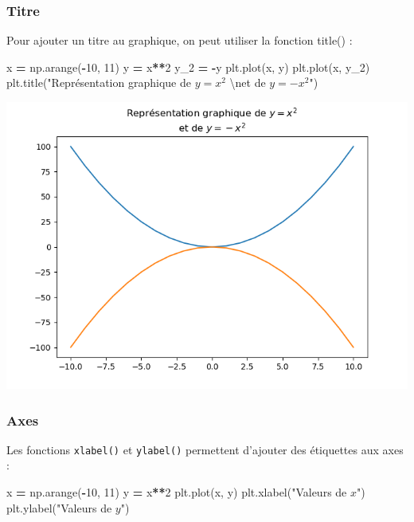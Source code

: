 \documentclass[12pt,]{book}
\newenvironment{Shaded}{\begin{snugshade}}{\end{snugshade}}
\newcommand{\DecValTok}[1]{\textcolor[rgb]{0.00,0.00,0.81}{#1}}
\newcommand{\CharTok}[1]{\textcolor[rgb]{0.31,0.60,0.02}{#1}}
\newcommand{\StringTok}[1]{\textcolor[rgb]{0.31,0.60,0.02}{#1}}
\newcommand{\OperatorTok}[1]{\textcolor[rgb]{0.81,0.36,0.00}{\textbf{#1}}}
\newcommand{\NormalTok}[1]{#1}
\numberwithin{equation}{section}
\numberwithin{countremarque}{section}
\begin{document}
\subsubsection{Titre}\label{titre}

Pour ajouter un titre au graphique, on peut utiliser la fonction title()
:

\begin{Shaded}
\begin{Highlighting}[]
\NormalTok{x }\OperatorTok{=}\NormalTok{ np.arange(}\OperatorTok{-}\DecValTok{10}\NormalTok{, }\DecValTok{11}\NormalTok{)}
\NormalTok{y }\OperatorTok{=}\NormalTok{ x}\OperatorTok{**}\DecValTok{2}
\NormalTok{y_2 }\OperatorTok{=} \OperatorTok{-}\NormalTok{y}
\NormalTok{plt.plot(x, y)}
\NormalTok{plt.plot(x, y_2)}
\NormalTok{plt.title(}\StringTok{"Représentation graphique de $y = x^2$ }\CharTok{\textbackslash{}n}\StringTok{et de $y = -x^2$"}\NormalTok{)}
\end{Highlighting}
\end{Shaded}

\begin{center}\includegraphics[width=9.03in]{figs/pyplot/plot_titre} \end{center}

\subsubsection{Axes}\label{axes}

Les fonctions \texttt{xlabel()} et \texttt{ylabel()} permettent
d'ajouter des étiquettes aux axes :

\begin{Shaded}
\begin{Highlighting}[]
\NormalTok{x }\OperatorTok{=}\NormalTok{ np.arange(}\OperatorTok{-}\DecValTok{10}\NormalTok{, }\DecValTok{11}\NormalTok{)}
\NormalTok{y }\OperatorTok{=}\NormalTok{ x}\OperatorTok{**}\DecValTok{2}
\NormalTok{plt.plot(x, y)}
\NormalTok{plt.xlabel(}\StringTok{"Valeurs de $x$"}\NormalTok{)}
\NormalTok{plt.ylabel(}\StringTok{"Valeurs de $y$"}\NormalTok{)}
\end{Highlighting}
\end{Shaded}
\end{document}
